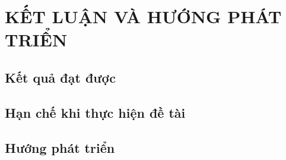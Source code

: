 \chapter{KẾT LUẬN VÀ HƯỚNG PHÁT TRIỂN}

\section{Kết quả đạt được}

\section{Hạn chế khi thực hiện đề tài}

\section{Hướng phát triển}
